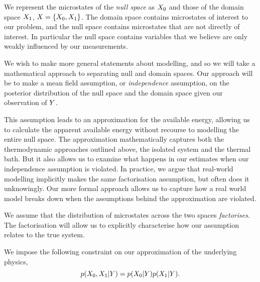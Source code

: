\documentclass[]{article}
\begin{document}
We represent the microstates of the \emph{null space} as
\(X_0\) and those of the domain space \(X_1\),
\(X = \{X_0, X_1\}\). The domain
space contains microstates of interest to our problem, and the null
space contains microstates that are not directly of interest. In
particular the null space contains variables that we believe are only
weakly influenced by our measurements.

We wish to make more general statements about modelling, and so we will take a mathematical approach to separating null and domain spaces. Our approach will be to make a mean field assumption, or \emph{independence} assumption, on the posterior distribution of the null space and the domain space given our observation of $Y$.

This assumption leads to an approximation for the available energy, allowing us to calculate the apparent available energy without recourse to modelling the entire null space. The approximation mathematically captures both the thermodynamic approaches outlined above, the isolated system and the thermal bath. But it also allows us to examine what happens in our estimates when our independence assumption is violated. In practice, we argue that real-world modelling implicitly makes the same factorisation assumption, but often does it unknowingly. Our more formal approach allows us to capture how a real world model breaks down when the assumptions behind the approximation are violated.

We assume that the distribution of microstates across the two spaces
\emph{factorises}. The factorisation will allow us to explicitly
characterise how our assumption relates to the true system. 

We impose the following constraint on our approximation of the underlying physics, 
\[
p(X_0, X_1 | Y) = p(X_0|Y) p(X_1 | Y).
\]
\end{document}

